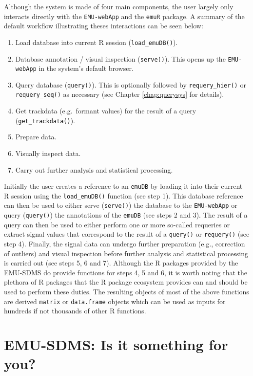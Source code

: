 \documentclass[
]{book}
\providecommand{\tightlist}{%
  \setlength{\itemsep}{0pt}\setlength{\parskip}{0pt}}
\begin{document}
Although the system is made of four main components, the user largely only interacts directly with the \texttt{EMU-webApp} and the \texttt{emuR} package. A summary of the default workflow illustrating theses interactions can be seen below:

\begin{enumerate}
\def\labelenumi{\arabic{enumi}.}
\tightlist
\item
  Load database into current R session (\texttt{load\_emuDB()}).
\item
  Database annotation / visual inspection (\texttt{serve()}). This opens up the \texttt{EMU-webApp} in the system's default browser.
\item
  Query database (\texttt{query()}). This is optionally followed by \texttt{requery\_hier()} or \texttt{requery\_seq()} as necessary (see Chapter \ref{chap:querysys} for details).
\item
  Get trackdata (e.g.~formant values) for the result of a query (\texttt{get\_trackdata()}).
\item
  Prepare data.
\item
  Visually inspect data.
\item
  Carry out further analysis and statistical processing.
\end{enumerate}

Initially the user creates a reference to an \texttt{emuDB} by loading it into their current R session using the \texttt{load\_emuDB()} function (see step 1). This database reference can then be used to either serve (\texttt{serve()}) the database to the \texttt{EMU-webApp} or query (\texttt{query()}) the annotations of the \texttt{emuDB} (see steps 2 and 3). The result of a query can then be used to either perform one or more so-called requeries or extract signal values that correspond to the result of a \texttt{query()} or \texttt{requery()} (see step 4). Finally, the signal data can undergo further preparation (e.g., correction of outliers) and visual inspection before further analysis and statistical processing is carried out (see steps 5, 6 and 7). Although the R packages provided by the EMU-SDMS do provide functions for steps 4, 5 and 6, it is worth noting that the plethora of R packages that the R package ecosystem provides can and should be used to perform these duties. The resulting objects of most of the above functions are derived \texttt{matrix} or \texttt{data.frame} objects which can be used as inputs for hundreds if not thousands of other R functions.

\hypertarget{emu-sdms-is-it-something-for-you}{%
\section{EMU-SDMS: Is it something for you?}\label{emu-sdms-is-it-something-for-you}}
\end{document}
